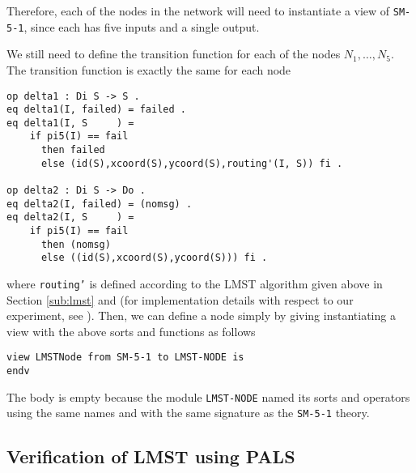 \documentclass[copyright,creativecommons]{eptcs}
\begin{document}
\noindent
Therefore, each of the nodes in the network will need to instantiate a view of
{\tt SM-5-1}, since each has five inputs and a single output.

We still need to define the transition function for each of the nodes
$N_1,\dotsc,N_5$. The transition function is exactly the same for each node


\begin{center}
\begin{small}
\begin{boxedminipage}{0.75\textwidth}
\begin{verbatim}
op delta1 : Di S -> S .
eq delta1(I, failed) = failed .
eq delta1(I, S     ) = 
    if pi5(I) == fail
      then failed
      else (id(S),xcoord(S),ycoord(S),routing'(I, S)) fi .

op delta2 : Di S -> Do .
eq delta2(I, failed) = (nomsg) .
eq delta2(I, S     ) = 
    if pi5(I) == fail
      then (nomsg)
      else ((id(S),xcoord(S),ycoord(S))) fi .
\end{verbatim}
\end{boxedminipage}
\end{small}
\end{center}

\noindent
where {\tt routing'} is defined according to the LMST algorithm given above in
Section \ref{sub:lmst} and \cite{li_2003_01} (for implementation details with
respect to our experiment, see \cite{katelman_2010_01}). Then, we can define a
node simply by giving instantiating a view with the above sorts and functions
as follows

\begin{center}
\begin{small}
\begin{boxedminipage}{0.60\textwidth}
\begin{verbatim}
view LMSTNode from SM-5-1 to LMST-NODE is
endv
\end{verbatim}
\end{boxedminipage}
\end{small}
\end{center}

\noindent
The body is empty because the module {\tt LMST-NODE} named its sorts and
operators using the same names and with the same signature as the {\tt SM-5-1}
theory.

\subsection{Verification of LMST using PALS} 
\label{sub:experiment}
\end{document}
